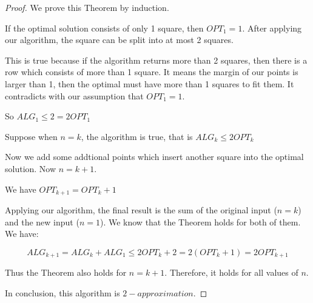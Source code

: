 \begin{proof}
  We prove this Theorem by induction.
  
  If the optimal solution consists of only 1 square, then $OPT_1 = 1$. After applying our algorithm, the square can be split into at most 2 squares.

  This is true because if the algorithm returns more than 2 squares, then there is a row which consists of more than 1 square. It means the margin of our points is larger than 1, then the optimal must have more than 1 squares to fit them. It contradicts with our assumption that $OPT_1 = 1$.
  
So $ALG_1 \leq 2 = 2OPT_1$

Suppose when $n = k$, the algorithm is true, that is $ALG_k \leq 2OPT_k$

Now we add some addtional points which insert another square into the optimal solution. Now $n = k + 1$.

We have $OPT_{k+1} = OPT_k + 1$

Applying our algorithm, the final result is the sum of the original input ($n = k$) and the new input ($n = 1$). We know that the Theorem holds for both of them. We have:

\begin{equation}
  ALG_{k + 1} = ALG_k + ALG_1 \leq 2OPT_k + 2 = 2(OPT_k + 1) = 2OPT_{k+1}
\end{equation}

Thus the Theorem also holds for $n = k + 1$. Therefore, it holds for all values of $n$.

  In conclusion, this algorithm is $2-approximation$.

\end{proof}
